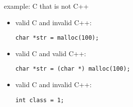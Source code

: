 \begin{frame}[fragile,label=CnotCpp]{example: C that is not C++}
\begin{itemize}
\item valid C and invalid C++:
\begin{verbatim}
char *str = malloc(100);
\end{verbatim}
\item valid C and valid C++:
\begin{verbatim}
char *str = (char *) malloc(100);
\end{verbatim}
\item valid C and invalid C++:
\begin{verbatim}
int class = 1;
\end{verbatim}
\end{itemize}
\end{frame}
